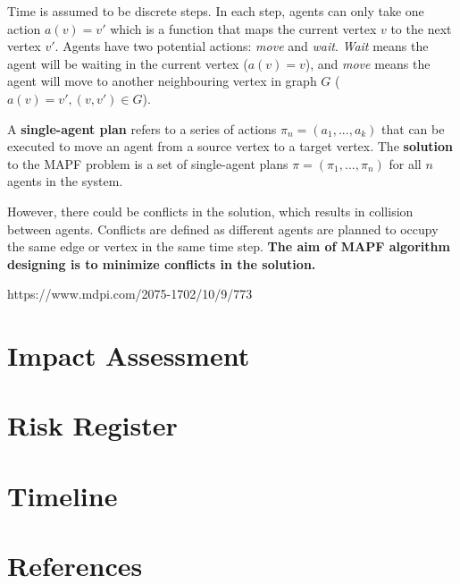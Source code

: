 \documentclass[12pt, oneside]{article}
\begin{document}
Time is assumed to be discrete steps. In each step, agents can only take one action $a(v)=v'$ which is a function that maps the current vertex $v$ to the next vertex $v'$. Agents have two potential actions: \textit{move} and \textit{wait}. \textit{Wait} means the agent will be waiting in the current vertex ($a(v)=v$), and \textit{move} means the agent will move to another neighbouring vertex in graph $G$ ($a(v)=v', (v,v')\in G$). 


A \textbf{single-agent plan} refers to a series of actions $\pi_{n} = (a_{1},...,a_{k})$ that can be executed to move an agent from a source vertex to a target vertex. The \textbf{solution} to the MAPF problem is a set of single-agent plans $\pi=(\pi_{1},...,\pi_{n})$ for all $n$ agents in the system. 

However, there could be conflicts in the solution, which results in collision between agents. Conflicts are defined as different agents are planned to occupy the same edge or vertex in the same time step. \textbf{The aim of MAPF algorithm designing is to minimize conflicts in the solution.}

https://www.mdpi.com/2075-1702/10/9/773







\section{Impact Assessment}
\section{Risk Register}
\section{Timeline}


\section{References}




\end{document}

